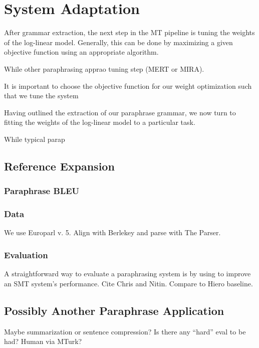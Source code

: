 \documentclass[11pt]{article}
\begin{document}
\section{System Adaptation} \label{approach}

After grammar extraction, the next step in the MT pipeline is tuning
the weights of the log-linear model. Generally, this can be done by
maximizing a given objective function using an appropriate algorithm. 

While other paraphrasing apprao
tuning step (MERT or MIRA).

It is important to choose the objective function for our weight
optimization such that we tune the system 


Having outlined the extraction of our paraphrase grammar, we now turn
to fitting the weights of the log-linear model to a particular
task. 


While typical parap

\subsection{Reference Expansion}


\subsubsection{Paraphrase BLEU} \label{pp_bleu}


\subsubsection{Data} \label{data}

We use Europarl v. 5. Align with Berlekey and parse with The Parser.

\subsubsection{Evaluation} \label{evaluation}

A straightforward way to evaluate a paraphrasing system is by using to
improve an SMT system's performance. Cite Chris and Nitin. Compare to
Hiero baseline.

\subsection{Possibly Another Paraphrase
  Application} \label{other_application}

Maybe summarization or sentence compression? Is there
any ``hard'' eval to be had? Human via MTurk?
\end{document}
